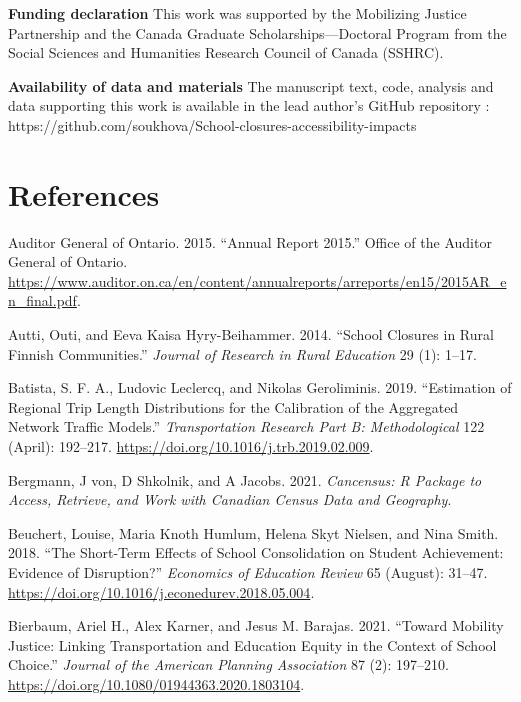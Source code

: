 \documentclass[
default
]{sn-jnl}
\newlength{\cslhangindent}
\newenvironment{CSLReferences}[2] %
 {\begin{list}{}{%
  \setlength{\itemindent}{0pt}
  \setlength{\leftmargin}{0pt}
  \setlength{\parsep}{0pt}
  \ifodd #1
   \setlength{\leftmargin}{\cslhangindent}
   \setlength{\itemindent}{-1\cslhangindent}
  \fi
  \setlength{\itemsep}{#2\baselineskip}}}
 {\end{list}}
\begin{document}
\textbf{Funding declaration} This work was supported by the Mobilizing
Justice Partnership and the Canada Graduate Scholarships---Doctoral
Program from the Social Sciences and Humanities Research Council of
Canada (SSHRC).

\textbf{Availability of data and materials} The manuscript text, code,
analysis and data supporting this work is available in the lead author's
GitHub repository :
https://github.com/soukhova/School-closures-accessibility-impacts

\pagebreak

\section{References}\label{references}

\label{refs}
\begin{CSLReferences}{1}{0}
Auditor General of Ontario. 2015. {``Annual Report 2015.''} Office of
the Auditor General of Ontario.
\url{https://www.auditor.on.ca/en/content/annualreports/arreports/en15/2015AR_en_final.pdf}.

Autti, Outi, and Eeva Kaisa Hyry-Beihammer. 2014. {``School Closures in
Rural Finnish Communities.''} \emph{Journal of Research in Rural
Education} 29 (1): 1--17.

Batista, S. F. A., Ludovic Leclercq, and Nikolas Geroliminis. 2019.
{``Estimation of Regional Trip Length Distributions for the Calibration
of the Aggregated Network Traffic Models.''} \emph{Transportation
Research Part B: Methodological} 122 (April): 192--217.
\url{https://doi.org/10.1016/j.trb.2019.02.009}.

Bergmann, J von, D Shkolnik, and A Jacobs. 2021. \emph{Cancensus: R
Package to Access, Retrieve, and Work with Canadian Census Data and
Geography}.

Beuchert, Louise, Maria Knoth Humlum, Helena Skyt Nielsen, and Nina
Smith. 2018. {``The Short-Term Effects of School Consolidation on
Student Achievement: Evidence of Disruption?''} \emph{Economics of
Education Review} 65 (August): 31--47.
\url{https://doi.org/10.1016/j.econedurev.2018.05.004}.

Bierbaum, Ariel H., Alex Karner, and Jesus M. Barajas. 2021. {``Toward
{Mobility Justice}: {Linking Transportation} and {Education Equity} in
the {Context} of {School Choice}.''} \emph{Journal of the American
Planning Association} 87 (2): 197--210.
\url{https://doi.org/10.1080/01944363.2020.1803104}.


\end{CSLReferences}
\end{document}
